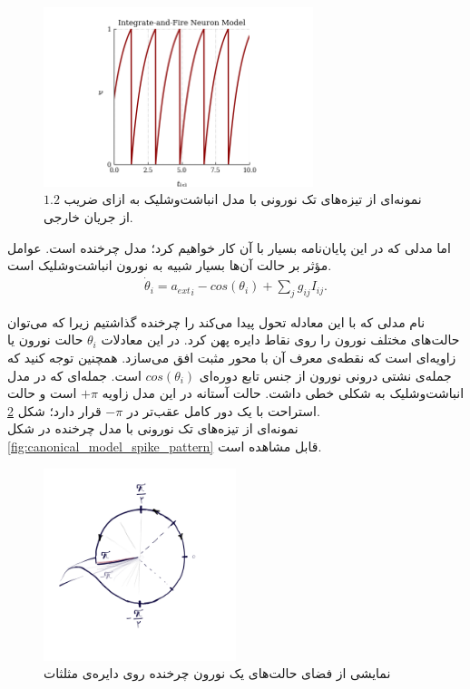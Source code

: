 \begin{figure}
	\centering
	\includegraphics[width=0.7\textwidth]{Figures/IF_model_spike_pattern.png}
	\caption{
		نمونه‌ای از تیزه‌های تک نورونی با مدل انباشت‌وشلیک به ازای ضریب $1.2$ از جریان خارجی.
	}
	\label{fig:IF_model_spike_pattern}
\end{figure}

اما مدلی که در این پایان‌نامه بسیار با آن کار خواهیم کرد؛ مدل چرخنده است. عوامل مؤثر بر حالت آن‌ها بسیار شبیه به نورون انباشت‌وشلیک است.
\begin{align}
	\dot{\theta}_i = {a_{ext}}_i - cos(\theta_i) + \sum_j g_{ij} I_{ij}.
\end{align}

نام مدلی که با این معادله تحول پیدا می‌کند را چرخنده گذاشتیم زیرا که می‌توان حالت‌های مختلف نورون را روی نقاط دایره پهن کرد. در این معادلات 
$\theta_i$
حالت نورون یا زاویه‌ای است که نقطه‌ی معرف آن با محور مثبت افق می‌سازد. همچنین توجه کنید که جمله‌ی نشتی درونی نورون از جنس تابع دوره‌ای
$cos(\theta_i)$
است. جمله‌ای که در مدل انباشت‌وشلیک به شکلی خطی داشت. حالت آستانه‌ در این مدل زاویه
$+\pi$
است و حالت استراحت با یک دور کامل عقب‌تر در
$-\pi$
قرار دارد؛ شکل
\ref{fig:rotational_picture}.\\
نمونه‌ای از تیزه‌های تک نورونی با مدل چرخنده در شکل 
\ref{fig:canonical_model_spike_pattern}
قابل مشاهده است.


\begin{figure}
	\centering
	\includegraphics[width=0.5\textwidth]{../Figures/Canonical model.png}
	\caption{نمایشی از فضای حالت‌های یک نورون چرخنده روی دایره‌ی مثلثات}
	\label{fig:rotational_picture}
\end{figure}

